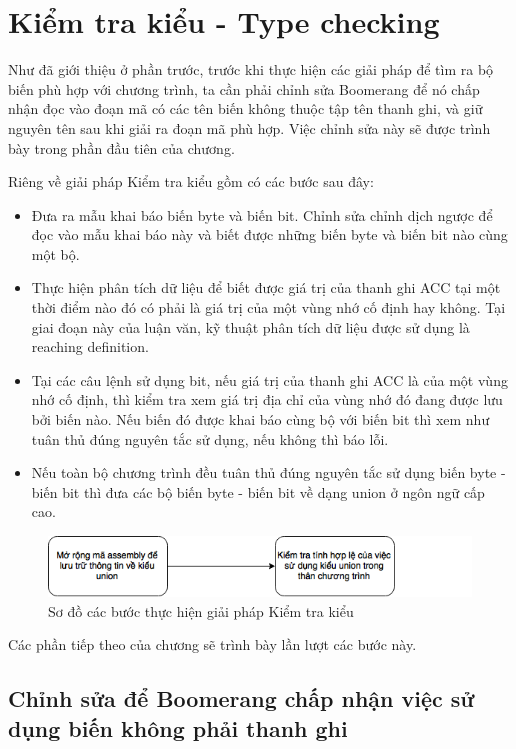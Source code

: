 \chapter{Kiểm tra kiểu - Type checking}
\label{chap:typechecking}
Như đã giới thiệu ở phần trước, trước khi thực hiện các giải pháp để tìm ra bộ biến phù hợp với chương trình, ta cần phải chỉnh sửa Boomerang để nó chấp nhận đọc vào đoạn mã có các tên biến không thuộc tập tên thanh ghi, và giữ nguyên tên sau khi giải ra đoạn mã phù hợp. Việc chỉnh sửa này sẽ được trình bày trong phần đầu tiên của chương.

Riêng về giải pháp Kiểm tra kiểu gồm có các bước sau đây:
\begin{itemize}
\item Đưa ra mẫu khai báo biến byte và biến bit. Chỉnh sửa chỉnh dịch ngược để đọc vào mẫu khai báo này và biết được những biến byte và biến bit nào cùng một bộ.
\item Thực hiện phân tích dữ liệu để biết được giá trị của thanh ghi ACC tại một thời điểm nào đó có phải là giá trị của một vùng nhớ cố định hay không. Tại giai đoạn này của luận văn, kỹ thuật phân tích dữ liệu được sử dụng là reaching definition.
\item Tại các câu lệnh sử dụng bit, nếu giá trị của thanh ghi ACC là của một vùng nhớ cố định, thì kiểm tra xem giá trị địa chỉ của vùng nhớ đó đang được lưu bởi biến nào. Nếu biến đó được khai báo cùng bộ với biến bit thì xem như tuân thủ đúng nguyên tắc sử dụng, nếu không thì báo lỗi.
\item Nếu toàn bộ chương trình đều tuân thủ đúng nguyên tắc sử dụng biến byte - biến bit thì đưa các bộ biến byte - biến bit về dạng union ở ngôn ngữ cấp cao.
\end{itemize}
\begin{figure}
	\centering
	\includegraphics[width=0.7\linewidth]{image/soDoTypeChecking}
	\caption{Sơ đồ các bước thực hiện giải pháp Kiểm tra kiểu}
	\label{fig:sodotypechecking}
\end{figure}

Các phần tiếp theo của chương sẽ trình bày lần lượt các bước này.

\section{Chỉnh sửa để Boomerang chấp nhận việc sử dụng biến không phải thanh ghi}
